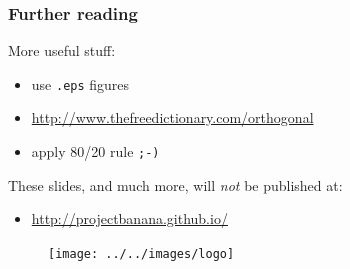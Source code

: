 \documentclass{beamer}
\begin{document}
\begin{frame}
\frametitle{Further reading}
More useful stuff:
\vspace{-0.4cm}
\begin{itemize}
 \item use \texttt{.eps} figures
 \item \url{http://www.thefreedictionary.com/orthogonal}
 \item apply 80/20 rule \texttt{;-)}
\end{itemize}

These slides, and much more, will \textit{not} be published at:
\vspace{-0.4cm}
\begin{itemize}
 \item \url{http://projectbanana.github.io/}
\end{itemize}
 \begin{figure}
\centering
 \texttt{[image: ../../images/logo]}
\end{figure}
\end{frame}
\end{document}
